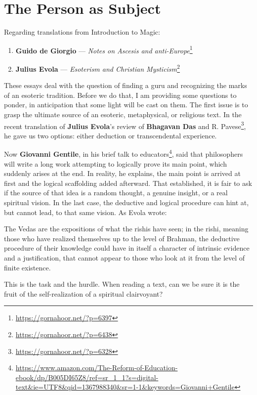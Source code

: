 \section{The Person as Subject}

Regarding translations from Introduction to Magic:

\begin{enumerate}
\item \textbf{Guido de Giorgio} — \textit{Notes on Ascesis and anti-Europe}\footnote{\url{https://gornahoor.net/?p=6397}}
\item \textbf{Julius Evola} — \textit{Esoterism and Christian Mysticism}\footnote{\url{https://gornahoor.net/?p=6438}}
\end{enumerate}
These essays deal with the question of finding a guru and recognizing the marks of an esoteric tradition. Before we do that, I am providing some questions to ponder, in anticipation that some light will be cast on them. The first issue is to grasp the ultimate source of an esoteric, metaphysical, or religious text. In the recent translation of \textbf{Julius Evola}'s review of \textbf{Bhagavan Das} and R. Pavese\footnote{\url{https://gornahoor.net/?p=6328}}, he gave us two options: either deduction or transcendental experience.

Now \textbf{Giovanni Gentile}, in his brief talk to educators\footnote{\url{https://www.amazon.com/The-Reform-of-Education-ebook/dp/B005DI65Z8/ref=sr_1_1?s=digital-text\&ie=UTF8\&qid=1367988340\&sr=1-1\&keywords=Giovanni+Gentile}}, said that philosophers will write a long work attempting to logically prove its main point, which suddenly arises at the end. In reality, he explains, the main point is arrived at first and the logical scaffolding added afterward. That established, it is fair to ask if the source of that idea is a random thought, a genuine insight, or a real spiritual vision. In the last case, the deductive and logical procedure can hint at, but cannot lead, to that same vision. As Evola wrote:

\begin{quotex}
The Vedas are the expositions of what the rishis have seen; in the rishi, meaning those who have realized themselves up to the level of Brahman, the deductive procedure of their knowledge could have in itself a character of intrinsic evidence and a justification, that cannot appear to those who look at it from the level of finite existence. 

\end{quotex}
This is the task and the hurdle. When reading a text, can we be sure it is the fruit of the self-realization of a spiritual clairvoyant?

